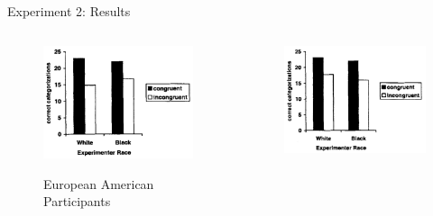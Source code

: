     \begin{frame}{Experiment 2: Results}
        \begin{columns}

            \begin{column}{0.45\textwidth}
                \begin{figure}
                \centering
                \includegraphics[height = 0.53 \textheight]{images/result2_euro.png}
                
                {\footnotesize European American Participants}
                \end{figure}
            \end{column}
            
            \begin{column}{0.45\textwidth}
                \begin{figure}
                    \centering
                    \includegraphics[height = 0.53 \textheight]{images/result2_asia.png}
                    

\end{figure}
\end{column}
\end{columns}
\end{frame}

